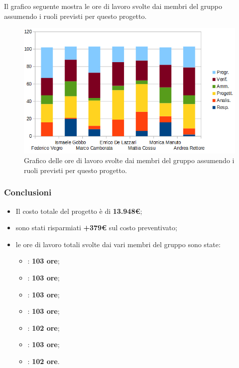 Il grafico seguente mostra le ore di lavoro svolte dai membri del gruppo assumendo i ruoli previsti per questo progetto.
\begin{figure}[H]
\begin{center}
\includegraphics[scale=0.70]{img/tot-persone-grafico.jpg}
\caption{Grafico delle ore di lavoro svolte dai membri del gruppo assumendo i ruoli previsti per questo progetto.}
\end{center}
\end{figure}

\clearpage
\subsubsection{Conclusioni}
\begin{itemize}
\item Il costo totale del progetto è di \textbf{13.948€};
\item sono stati risparmiati \textbf{+379€} sul costo preventivato;
\item le ore di lavoro totali svolte dai vari membri del gruppo sono state:
\begin{itemize}
	\item \CaMa : \textbf{103 ore};
	\item \CoMa : \textbf{103 ore};
	\item \DeEn : \textbf{103 ore};
	\item \GoIs : \textbf{103 ore};
	\item \MaMo : \textbf{102 ore};
	\item \ReAn : \textbf{103 ore};
	\item \VeFe : \textbf{102 ore}.
\end{itemize}
\end{itemize}






